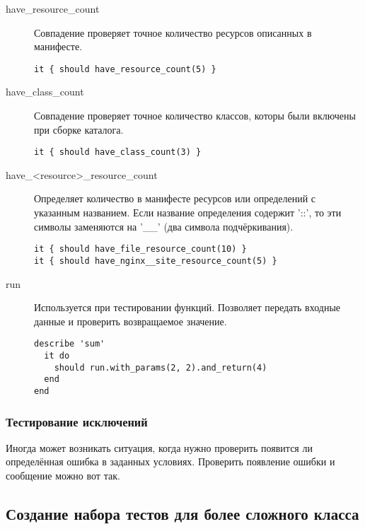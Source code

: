 \begin{description}
\item[have\_resource\_count]
Совпадение проверяет точное количество ресурсов описанных в манифесте.

\begin{lstlisting}
it { should have_resource_count(5) }
\end{lstlisting}

\item[have\_class\_count]
Совпадение проверяет точное количество классов, которы были включены при сборке каталога.

\begin{lstlisting}
it { should have_class_count(3) }
\end{lstlisting}

\item[have\_\textless{}resource\textgreater{}\_resource\_count]
Определяет количество в манифесте ресурсов или определений с указанным названием. Если название определения содержит '::', то эти символы заменяются на '\_\_' (два символа подчёркивания).

\begin{lstlisting}
it { should have_file_resource_count(10) }
it { should have_nginx__site_resource_count(5) }
\end{lstlisting}

\item[run]
Используется при тестировании функций. Позволяет передать входные данные и проверить возвращаемое значение.

\begin{lstlisting}
describe 'sum'
  it do
    should run.with_params(2, 2).and_return(4)
  end
end
\end{lstlisting}

\end{description}

\subsubsection{Тестирование исключений}

Иногда может возникать ситуация, когда нужно проверить появится ли определённая ошибка в заданных условиях. Проверить появление ошибки и сообщение можно вот так.



\subsection{Создание набора тестов для более сложного класса}
